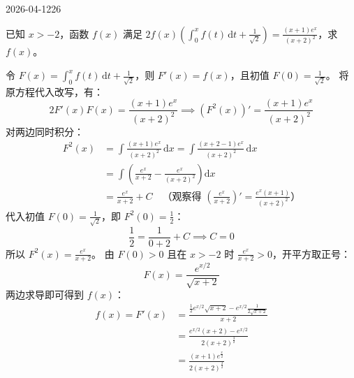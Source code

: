 \begin{mistake}{2026-04-12}{26}

\begin{problemcontent}
已知 \( x > -2 \)，函数 \(f(x)\) 满足 \( \displaystyle 2f(x)\left(\int_0^x f(t)\,\mathrm{d}t+\frac{1}{\sqrt{2}}\right)=\frac{(x+1)e^x}{(x+2)^2} \)，求 \(f(x)\)。
\end{problemcontent}

\begin{solutioncontent}
令 \( \displaystyle F(x) = \int_0^x f(t)\,\mathrm{d}t + \frac{1}{\sqrt{2}} \)，则 \(F'(x) = f(x)\)，且初值 \(F(0) = \frac{1}{\sqrt{2}}\)。
将原方程代入改写，有：
\[
2F'(x)F(x) = \frac{(x+1)e^x}{(x+2)^2} \implies \left(F^2(x)\right)' = \frac{(x+1)e^x}{(x+2)^2}
\]
对两边同时积分：
\[
\begin{aligned}
F^2(x) &= \int \frac{(x+1)e^x}{(x+2)^2} \,\mathrm{d}x = \int \frac{(x+2-1)e^x}{(x+2)^2} \,\mathrm{d}x \\
       &= \int \left( \frac{e^x}{x+2} - \frac{e^x}{(x+2)^2} \right) \mathrm{d}x \\
       &= \frac{e^x}{x+2} + C \quad \text{（观察得 } \left(\frac{e^x}{x+2}\right)' = \frac{e^x(x+1)}{(x+2)^2} \text{）}
\end{aligned}
\]
代入初值 \(F(0) = \frac{1}{\sqrt{2}}\)，即 \(F^2(0) = \frac{1}{2}\)：
\[
\frac{1}{2} = \frac{1}{0+2} + C \implies C = 0
\]
所以 \(F^2(x) = \frac{e^x}{x+2}\)。
由 \(F(0) > 0\) 且在 \(x > -2\) 时 \(\frac{e^x}{x+2} > 0\)，开平方取正号：
\[
F(x) = \frac{e^{x/2}}{\sqrt{x+2}}
\]
两边求导即可得到 \(f(x)\)：
\[
\begin{aligned}
f(x) = F'(x) &= \frac{ \frac{1}{2}e^{x/2}\sqrt{x+2} - e^{x/2}\frac{1}{2\sqrt{x+2}} }{ x+2 } \\
             &= \frac{ e^{x/2}(x+2) - e^{x/2} }{ 2(x+2)^{\frac{3}{2}} } \\
             &= \frac{(x+1)e^{\frac{x}{2}}}{2(x+2)^{\frac{3}{2}}}
\end{aligned}
\]
\end{solutioncontent}


\end{mistake}
